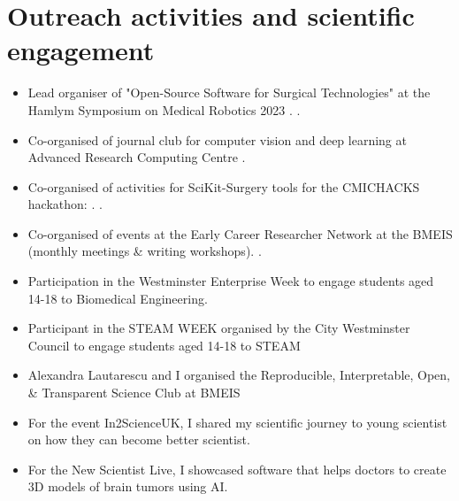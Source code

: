 \documentclass{mycv}
\begin{document}
\section{Outreach activities and scientific engagement}
\begin{itemize}
\item Lead organiser of "Open-Source Software for Surgical Technologies" at the Hamlym Symposium on Medical Robotics 2023
\href{https://www.hamlynsymposium.org/events/open-source-software-for-surgical-technologies/}{\faExternalLink*}. 
.


\item Co-organised of journal club for computer vision and deep learning at Advanced Research Computing Centre .
\item Co-organised of activities for SciKit-Surgery tools for the CMICHACKS hackathon: \href{https://cmic-ucl.github.io/CMICHACKS//}{\faExternalLink*}. .
\item Co-organised of events at the Early Career Researcher Network at the BMEIS (monthly meetings \& writing workshops). .
\item Participation in the Westminster Enterprise Week to engage students aged 14-18 to Biomedical Engineering. 
\item Participant in the STEAM WEEK organised by the City Westminster Council to engage students aged 14-18 to STEAM \href{https://twitter.com/_mxochicale/status/1374407825607200769}{\faTwitter} 
\item Alexandra Lautarescu and I organised the Reproducible, Interpretable, Open, \& Transparent Science Club at BMEIS 
\item For the event In2ScienceUK, I shared my scientific journey to young scientist on how they can become better scientist.  
\item For the New Scientist Live, I showcased software that helps doctors to create 3D models of brain tumors using AI. 


\end{itemize}
\end{document}
